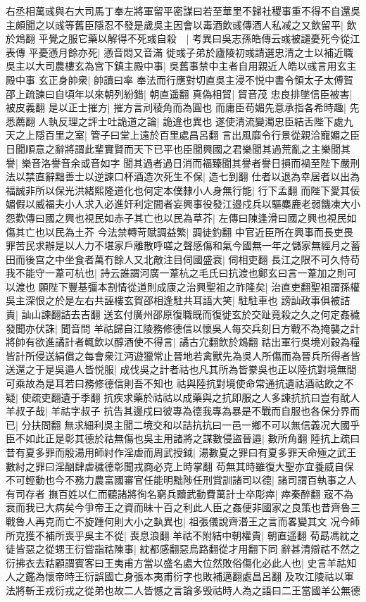 右丞相萬彧與右大司馬丁奉左將軍留平密謀曰若至華里不歸社稷事重不得不自還吳主頗聞之以彧等舊臣隱忍不發是歲吳主因會以毒酒飲彧傳酒人私减之又飲留平|{
	飲於鴆翻}
平覺之服它藥以解得不死彧自殺　|{
	考異曰吳志孫皓傳云彧被譴憂死今從江表傳}
平憂懣月餘亦死|{
	懣音悶又音滿}
徙彧子弟於廬陵初彧請選忠清之士以補近職吳主以大司農樓玄為宫下鎮主殿中事|{
	吳舊事禁中主者自用親近人皓以彧言用玄主殿中事}
玄正身帥衆|{
	帥讀曰率}
奉法而行應對切直吳主浸不悦中書令領太子太傅賀邵上疏諫曰自頃年以來朝列紛錯|{
	朝直遥翻}
真偽相貿|{
	貿音茂}
忠良排墜信臣被害|{
	被皮義翻}
是以正士摧方|{
	摧方言刓稜角而為圓也}
而庸臣苟媚先意承指各希時趣|{
	先悉薦翻}
人執反理之評士吐詭道之論|{
	詭違也異也}
遂使清流變濁忠臣結舌陛下處九天之上隱百里之室|{
	管子曰堂上遠於百里處昌呂翻}
言出風靡令行景從親洽寵媚之臣日聞順意之辭將謂此輩實賢而天下已平也臣聞興國之君樂聞其過荒亂之主樂聞其譽|{
	樂音洛譽音余或音如字}
聞其過者過日消而福臻聞其譽者譽日損而禍至陛下嚴刑法以禁直辭黜善士以逆諫口杯酒造次死生不保|{
	造七到翻}
仕者以退為幸居者以出為福誠非所以保光洪緒熙隆道化也何定本僕隸小人身無行能|{
	行下孟翻}
而陛下愛其佞媚假以威福夫小人求入必進奸利定間者妄興事役發江邉戍兵以驅麋鹿老弱饑凍大小怨歎傳曰國之興也視民如赤子其亡也以民為草芥|{
	左傳曰陳逢滑曰國之興也視民如傷其亡也以民為土芥}
今法禁轉苛賦調益繁|{
	調徒釣翻}
中官近臣所在興事而長吏畏罪苦民求辦是以人力不堪家戶離散呼嗟之聲感傷和氣今國無一年之儲家無經月之蓄田而後宫之中坐食者萬冇餘人又北敵注目伺國盛衰|{
	伺相吏翻}
長江之限不可久恃苟我不能守一葦可杭也|{
	詩云誰謂河廣一葦杭之毛氏曰抗渡也鄭玄曰言一葦加之則可以渡也}
願陛下豐基彊本割情從道則成康之治興聖祖之祚隆矣|{
	治直吏翻聖祖謂孫權}
吳主深恨之於是左右共誣樓玄賀邵相逢駐共耳語大笑|{
	駐駐車也}
謗訕政事俱被詰責|{
	訕山諫翻詰去吉翻}
送玄付廣州邵原復職既而復徙玄於交趾竟殺之久之何定姦穢發聞亦伏誅|{
	聞音問}
羊祜歸自江陵務修德信以懷吳人每交兵刻日方戰不為掩襲之計將帥有欲進譎計者輒飲以醇酒使不得言|{
	譎古宂翻飲於鴆翻}
祜出軍行吳境刈穀為糧皆計所侵送絹償之每會衆江沔遊獵常止晉地若禽獸先為吳人所傷而為晉兵所得者皆送還之于是吳邉人皆悦服|{
	成伐吳之計者祜也凡其所為皆豢吳也正以陸抗對境無間可乘故為是耳若曰務修德信則吾不知也}
祜與陸抗對境使命常通抗遺祜酒祜飲之不疑|{
	使疏吏翻遺于季翻}
抗疾求藥於祜祜以成藥與之抗即服之人多諫抗抗曰豈有酖人羊叔子哉|{
	羊祜字叔子}
抗告其邊戍曰彼專為德我專為暴是不戰而自服也各保分界而已|{
	分扶問翻}
無求細利吳主聞二境交和以詰抗抗曰一邑一鄉不可以無信義况大國乎臣不如此正是彰其德於祜無傷也吳主用諸將之謀數侵盜晉邉|{
	數所角翻}
陸抗上疏曰昔有夏多罪而殷湯用師紂作淫虐而周武授鉞|{
	湯數夏之罪曰有夏多罪天命殛之武王數紂之罪曰淫酗肆虐穢德彰聞戎商必克上時掌翻}
苟無其時雖復大聖亦宜養威自保不可輕動也今不務力農富國審官任能明黜陟任刑賞訓諸司以德|{
	諸司謂百執事之人有司存者}
撫百姓以仁而聽諸將徇名窮兵黷武動費萬計士卒彫瘁|{
	瘁秦醉翻}
宼不為衰而我已大病矣今爭帝王之資而昧十百之利此人臣之姦便非國家之良策也昔齊魯三戰魯人再克而亡不旋踵何則大小之埶異也|{
	祖張儀說齊湣王之言而畧變其文}
况今師所克獲不補所喪乎吳主不從|{
	喪息浪翻}
羊祜不附結中朝權貴|{
	朝直遥翻}
荀勗馮紞之徒皆惡之從甥王衍嘗詣祜陳事|{
	紞都感翻惡烏路翻從才用翻下同}
辭甚清辯祜不然之衍拂衣去祜顧謂賓客曰王夷甫方當以盛名處大位然敗俗傷化必此人也|{
	史言羊祜知人之鑑為懷帝時王衍誤國亡身張本夷甫衍字也敗補邁翻處昌呂翻}
及攻江陵祜以軍法將斬王戎衍戎之從弟也故二人皆憾之言論多毁祜時人為之語曰二王當國羊公無德


